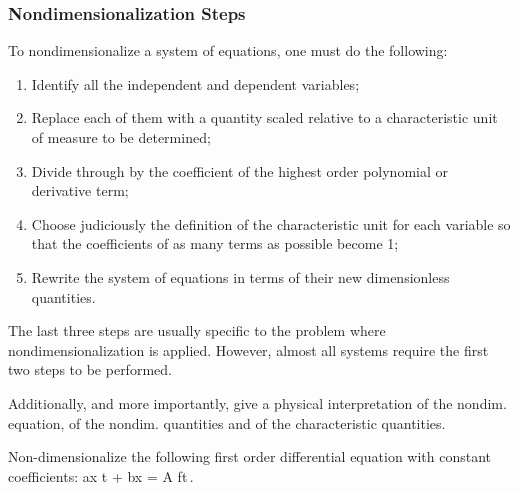 \subsubsection{Nondimensionalization Steps}
To nondimensionalize a system of equations, one must do the following:
\begin{enumerate}
\item Identify all the independent and dependent variables;
\item Replace each of them with a quantity scaled relative to a characteristic unit of measure to be determined;
\item Divide through by the coefficient of the highest order polynomial or derivative term;
\item Choose judiciously the definition of the characteristic unit for each variable so that the coefficients of as many terms as possible become 1;
\item Rewrite the system of equations in terms of their new dimensionless quantities.
\end{enumerate}
The last three steps are usually specific to the problem where nondimensionalization is applied. However, almost all systems require the first two steps to be performed.

\begin{note}
Additionally, and more importantly, give a physical interpretation of the nondim. equation, of the nondim. quantities and of the characteristic quantities.
\end{note}


\begin{example}
Non-dimensionalize the following first order differential equation with constant coefficients:
\beq
a\xod x t + bx = A f\vat t\,.
\eeq
\end{example}

